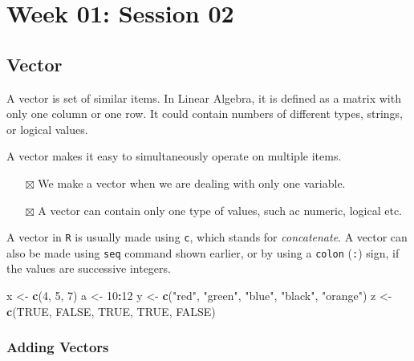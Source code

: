 \documentclass[
]{book}
\newenvironment{Shaded}{\begin{snugshade}}{\end{snugshade}}
\newcommand{\DecValTok}[1]{\textcolor[rgb]{0.00,0.00,0.81}{#1}}
\newcommand{\KeywordTok}[1]{\textcolor[rgb]{0.13,0.29,0.53}{\textbf{#1}}}
\newcommand{\NormalTok}[1]{#1}
\newcommand{\OperatorTok}[1]{\textcolor[rgb]{0.81,0.36,0.00}{\textbf{#1}}}
\newcommand{\OtherTok}[1]{\textcolor[rgb]{0.56,0.35,0.01}{#1}}
\newcommand{\StringTok}[1]{\textcolor[rgb]{0.31,0.60,0.02}{#1}}
\providecommand{\tightlist}{%
  \setlength{\itemsep}{0pt}\setlength{\parskip}{0pt}}
\begin{document}
\hypertarget{week-01-session-02}{%
\section{Week 01: Session 02}\label{week-01-session-02}}

\hypertarget{vector}{%
\subsection{Vector}\label{vector}}

A vector is set of similar items. In Linear Algebra, it is defined as a matrix with only one column or one row. It could contain numbers of different types, strings, or logical values.

A vector makes it easy to simultaneously operate on multiple items.

\begin{itemize}
\tightlist
\item[$\boxtimes$]
  We make a vector when we are dealing with only one variable.
\item[$\boxtimes$]
  A vector can contain only one type of values, such ac numeric, logical etc.
\end{itemize}

A vector in \texttt{R} is usually made using \texttt{c}, which stands for \emph{concatenate}. A vector can also be made using \texttt{seq} command shown earlier, or by using a \texttt{colon} (\texttt{:}) sign, if the values are successive integers.

\begin{Shaded}
\begin{Highlighting}[]
\NormalTok{x <-}\StringTok{ }\KeywordTok{c}\NormalTok{(}\DecValTok{4}\NormalTok{, }\DecValTok{5}\NormalTok{, }\DecValTok{7}\NormalTok{)}
\NormalTok{a <-}\StringTok{ }\DecValTok{10}\OperatorTok{:}\DecValTok{12}
\NormalTok{y <-}\StringTok{ }\KeywordTok{c}\NormalTok{(}\StringTok{"red"}\NormalTok{, }\StringTok{"green"}\NormalTok{, }\StringTok{"blue"}\NormalTok{, }\StringTok{"black"}\NormalTok{, }\StringTok{"orange"}\NormalTok{)}
\NormalTok{z <-}\StringTok{ }\KeywordTok{c}\NormalTok{(}\OtherTok{TRUE}\NormalTok{, }\OtherTok{FALSE}\NormalTok{, }\OtherTok{TRUE}\NormalTok{, }\OtherTok{TRUE}\NormalTok{, }\OtherTok{FALSE}\NormalTok{)}
\end{Highlighting}
\end{Shaded}

\hypertarget{adding-vectors}{%
\subsubsection{Adding Vectors}\label{adding-vectors}}
\end{document}

